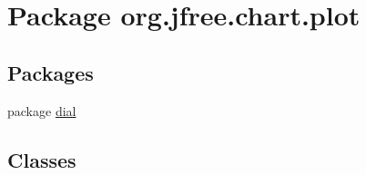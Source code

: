 \hypertarget{namespaceorg_1_1jfree_1_1chart_1_1plot}{}\section{Package org.\+jfree.\+chart.\+plot}
\label{namespaceorg_1_1jfree_1_1chart_1_1plot}
\subsection*{Packages}
\begin{DoxyCompactItemize}
\item 
package \mbox{\hyperlink{namespaceorg_1_1jfree_1_1chart_1_1plot_1_1dial}{dial}}
\end{DoxyCompactItemize}
\subsection*{Classes}
